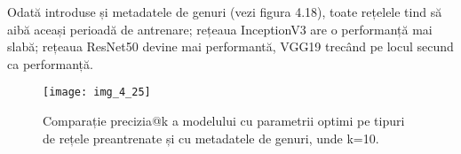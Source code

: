 Odată introduse și metadatele de genuri (vezi figura 4.18), toate rețelele tind să aibă aceași perioadă de antrenare; rețeaua InceptionV3 are o performanță mai slabă; rețeaua ResNet50 devine mai performantă, VGG19 trecând pe locul secund ca performanță. 
\begin{figure}[!h]
	\centering
	\texttt{[image: img\_4\_25]}
	\caption[Comparație precizia@k a modelului cu parametrii optimi pe tipuri de rețele preantrenate și cu metadatele de genuri]{Comparație precizia@k a modelului cu parametrii optimi pe tipuri de rețele preantrenate și cu metadatele de genuri, unde k=10.}
\end{figure}